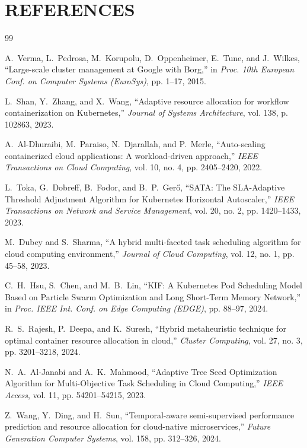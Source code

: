 \documentclass[12pt,a4paper]{report}
\begin{document}
\chapter{REFERENCES}
{\renewcommand{\chapter}[2]{}%
\begin{thebibliography}{99}

A.~Verma, L.~Pedrosa, M.~Korupolu, D.~Oppenheimer, E.~Tune, and J.~Wilkes,
``Large-scale cluster management at Google with Borg,''
in \textit{Proc. 10th European Conf. on Computer Systems (EuroSys)}, pp. 1--17, 2015.

L.~Shan, Y.~Zhang, and X.~Wang,
``Adaptive resource allocation for workflow containerization on Kubernetes,''
\textit{Journal of Systems Architecture}, vol. 138, p. 102863, 2023.

A.~Al-Dhuraibi, M.~Paraiso, N.~Djarallah, and P.~Merle,
``Auto-scaling containerized cloud applications: A workload-driven approach,''
\textit{IEEE Transactions on Cloud Computing}, vol. 10, no. 4, pp. 2405--2420, 2022.

L.~Toka, G.~Dobreff, B.~Fodor, and B.~P.~Ger\H{o},
``SATA: The SLA-Adaptive Threshold Adjustment Algorithm for Kubernetes Horizontal Autoscaler,''
\textit{IEEE Transactions on Network and Service Management}, vol. 20, no. 2, pp. 1420--1433, 2023.

M.~Dubey and S.~Sharma,
``A hybrid multi-faceted task scheduling algorithm for cloud computing environment,''
\textit{Journal of Cloud Computing}, vol. 12, no. 1, pp. 45--58, 2023.

C.~H.~Hsu, S.~Chen, and M.~B.~Lin,
``KIF: A Kubernetes Pod Scheduling Model Based on Particle Swarm Optimization and Long Short-Term Memory Network,''
in \textit{Proc. IEEE Int. Conf. on Edge Computing (EDGE)}, pp. 88--97, 2024.

R.~S.~Rajesh, P.~Deepa, and K.~Suresh,
``Hybrid metaheuristic technique for optimal container resource allocation in cloud,''
\textit{Cluster Computing}, vol. 27, no. 3, pp. 3201--3218, 2024.

N.~A.~Al-Janabi and A.~K.~Mahmood,
``Adaptive Tree Seed Optimization Algorithm for Multi-Objective Task Scheduling in Cloud Computing,''
\textit{IEEE Access}, vol. 11, pp. 54201--54215, 2023.

Z.~Wang, Y.~Ding, and H.~Sun,
``Temporal-aware semi-supervised performance prediction and resource allocation for cloud-native microservices,''
\textit{Future Generation Computer Systems}, vol. 158, pp. 312--326, 2024.


\end{thebibliography}}
\end{document}
